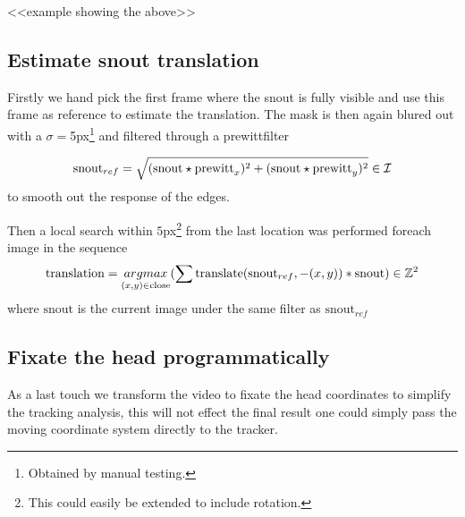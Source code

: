     <<example showing the above>>

\subsection{Estimate snout translation}
    Firstly we hand pick the first frame where the snout is fully visible and use this frame as reference to estimate the translation.
    The mask is then again blured out with a $\sigma=$5px\footnote{Obtained by manual testing.} and filtered through a prewittfilter
    
    \begin{equation}
       \text{snout}_{ref} = \sqrt{(\text{snout} \star \text{prewitt}_x)^2 + ( \text{snout} \star \text{prewitt}_y )^2}\in\mathcal{I}
    \end{equation}
    to smooth out the response of the edges.

    Then a local search within $5$px\footnote{This could easily be extended to include rotation.} from the last location was 
    performed foreach image in the sequence
    \begin{equation}
       \text{translation} = \underset{(x,y)\in\text{close}}{argmax}
                                {
                                    (\sum 
                                        \text{translate}(\text{snout}_{ref},-(x,y))*\text{snout}
                                    )
                                } \in \mathbb{Z}^2
    \end{equation}
    where $\text{snout}$ is the current image under the same filter as $\text{snout}_{ref}$

\subsection{Fixate the head programmatically}
    As a last touch we transform the video to fixate the head coordinates to 
    simplify the tracking analysis, 
    this will not effect the final result one could simply pass 
    the moving coordinate system directly to the tracker. 

